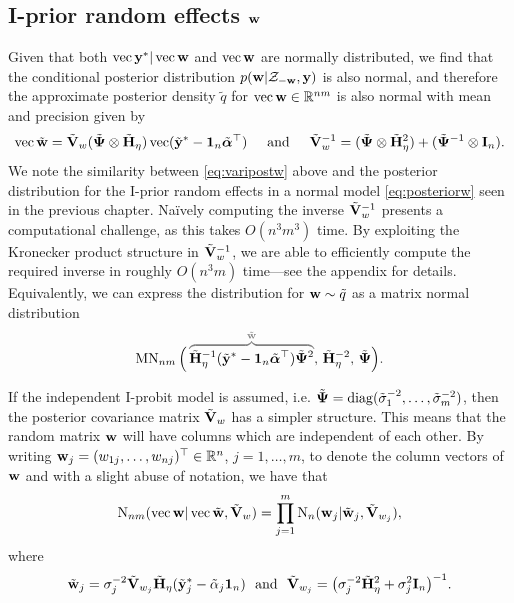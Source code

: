 \subsection[I-prior random effects w]{I-prior random effects ${\mathbf w}$}

Given that both $\operatorname{vec} {\mathbf y}^* | \operatorname{vec} {\mathbf w}$ and $\operatorname{vec}{\mathbf w}$ are normally distributed, we find that the conditional posterior distribution $p({\mathbf w}|{\mathcal Z}_{-{\mathbf w}},{\mathbf y})$ is also normal, and therefore the approximate posterior density $\tilde q$ for $\operatorname{vec} {\mathbf w} \in \mathbb{R}^{nm}$ is also normal with mean and precision given by
\begin{gather}\label{eq:varipostw}
   \operatorname{vec} \tilde{{\mathbf w}} = \tilde{{\mathbf V}}_w 
    (\tilde{{\bm\Psi}} \otimes \tilde{{\mathbf H}}_\eta) \operatorname{vec} (\tilde{{\mathbf y}}^* - {\mathbf 1}_n\tilde{{\bm\alpha}}^\top)
  \hspace{0.5cm}\text{and}\hspace{0.5cm} 
  \tilde {{\mathbf V}}_w^{-1} = (\tilde{{\bm\Psi}} \otimes \tilde{{\mathbf H}}_\eta^2) + (\tilde{{\bm\Psi}}^{-1} \otimes {\mathbf I}_n).
\end{gather}
We note the similarity between \cref{eq:varipostw} above and the posterior distribution for the I-prior random effects in a normal model \cref{eq:posteriorw} seen in the previous chapter.
Naïvely computing the inverse $\tilde{{\mathbf V}}_w^{-1}$ presents a computational challenge, as this takes $O(n^3m^3)$ time. 
By exploiting the Kronecker product structure in $\tilde{{\mathbf V}}_w^{-1}$, we are able to efficiently compute the required inverse in roughly $O(n^3m)$ time---see the appendix for details.
Equivalently, we can express the distribution for ${\mathbf w} \sim \tilde q$ as a matrix normal distribution
\begin{align}\label{eq:varipostw2}
  \MN_{nm}\Big(\,
  \greyoverbrace{\tilde\bH_\eta^{-1}(\tilde\by^* - \bone_n\tilde\balpha^\top)\tilde\bPsi^2}{\tilde\bw} ,\, 
  \tilde\bH_\eta^{-2},\,
  \tilde\bPsi  
  \Big).
\end{align}

If the independent I-probit model is assumed, i.e. $\tilde{{\bm\Psi}} = \operatorname{diag}(\tilde\sigma_1^{-2},\dots,\tilde\sigma_m^{-2})$, then the posterior covariance matrix $\tilde{{\mathbf V}}_w$ has a simpler structure.
This means that the random matrix ${\mathbf w}$ will have columns which are independent of each other.
By writing ${\mathbf w}_j = (w_{1j},\dots,w_{nj})^\top \in \mathbb{R}^n$, $j=1,\dots,m$, to denote the column vectors of ${\mathbf w}$ and with a slight abuse of notation, we have that
\begin{align*}
  \operatorname{N}_{nm}(\operatorname{vec} {\mathbf w}|\operatorname{vec}\tilde{\mathbf w}, \tilde{{\mathbf V}}_w) 
  = \prod_{j=1}^m \operatorname{N}_{n}({\mathbf w}_j|\tilde{{\mathbf w}}_j, \tilde{{\mathbf V}}_{w_j}),
\end{align*}
where 
\[
  \tilde {{\mathbf w}}_j = \sigma_j^{-2}\tilde {{\mathbf V}}_{w_j}\tilde{{\mathbf H}}_\eta (\tilde{{\mathbf y}}^*_j - \tilde\alpha_j{\mathbf 1}_n) \ \text{ and } \ \tilde {{\mathbf V}}_{w_j} = \big(\sigma_j^{-2}\tilde{{\mathbf H}}_{\eta}^2 + \sigma_j^{2}{\mathbf I}_n \big)^{-1}.
\]

